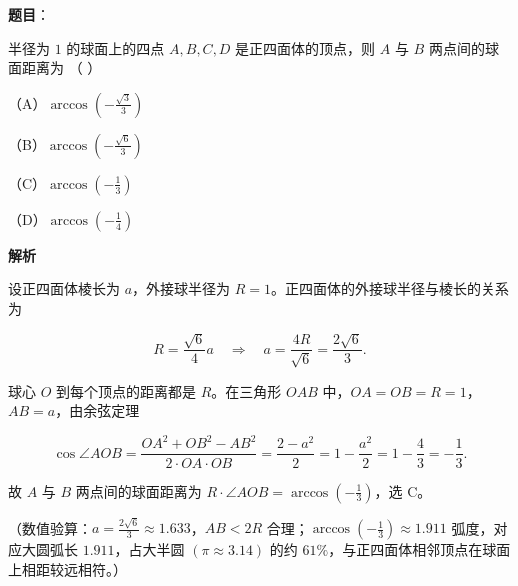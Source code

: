 \begin{answer}

\textbf{题目}：

半径为 $1$ 的球面上的四点 $A,B,C,D$ 是正四面体的顶点，则 $A$ 与 $B$ 两点间的球面距离为 （ ）

（A）$\arccos\left(-\frac{\sqrt3}{3}\right)$

（B）$\arccos\left(-\frac{\sqrt6}{3}\right)$

（C）$\arccos\left(-\frac13\right)$

（D）$\arccos\left(-\frac14\right)$

\textbf{解析}

设正四面体棱长为 $a$，外接球半径为 $R=1$。正四面体的外接球半径与棱长的关系为

\nopagebreak[4]
\[R=\frac{\sqrt6}{4}a\quad\Longrightarrow\quad a=\frac{4R}{\sqrt6}=\frac{2\sqrt6}{3}.\]

球心 $O$ 到每个顶点的距离都是 $R$。在三角形 $OAB$ 中，$OA=OB=R=1$，$AB=a$，由余弦定理

\nopagebreak[4]
\[\cos\angle AOB=\frac{OA^2+OB^2-AB^2}{2\cdot OA\cdot OB}=\frac{2-a^2}{2}=1-\frac{a^2}{2}=1-\frac{4}{3}=-\frac13.\]

故 $A$ 与 $B$ 两点间的球面距离为 $R\cdot\angle AOB=\arccos\left(-\frac13\right)$，选 C。

（数值验算：$a=\frac{2\sqrt6}{3}\approx1.633$，$AB<2R$ 合理；$\arccos\left(-\frac13\right)\approx1.911$ 弧度，对应大圆弧长 $1.911$，占大半圆 $(\pi\approx3.14)$ 的约 $61\%$，与正四面体相邻顶点在球面上相距较远相符。）


\end{answer}
